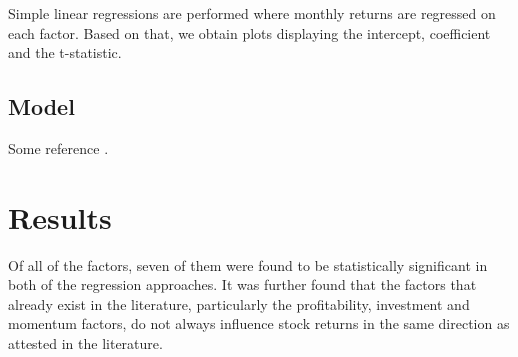 \documentclass[12pt, a4paper]{article}%
\begin{document}
Simple linear regressions are performed where monthly returns are regressed on each factor. Based on that, we obtain plots displaying the intercept, coefficient and the t-statistic.\\ %

\subsection{Model}
Some reference \cite{Paolellalinear}.

\section{Results}
Of all of the factors, seven of them were found to be statistically significant in both of the regression approaches. It was further found that the factors that already exist in the literature, particularly the profitability, investment and momentum factors, do not always influence stock returns in the same direction as attested in the literature. %

\end{document}
